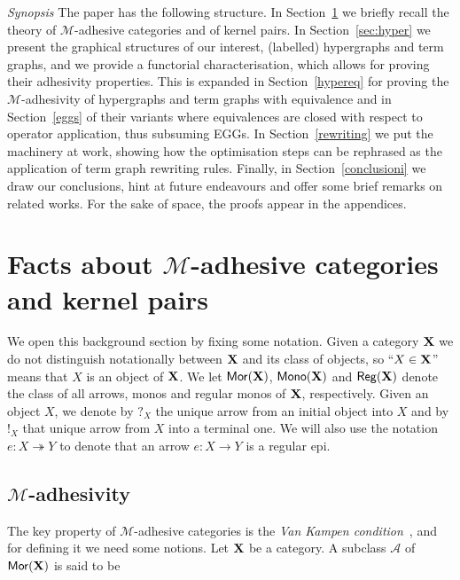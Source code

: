 \documentclass[a4paper,UKenglish,cleveref,pdftex,amsthm,thm-restate,numberwithinsect]{cas-sc}
\theoremstyle{plain}
\theoremstyle{definition}
\def\X{\textbf {\textup{X}}}
\newcommand{\mor}{\mathsf{Mor}}
\newcommand{\mon}{\mathsf{Mono}}
\newcommand{\reg}{\mathsf{Reg}}
\newcommand{\eto}{\twoheadrightarrow}
\begin{document}
\emph{Synopsis}
The paper has the following structure. 
In Section~\ref{sec:ade} we briefly recall 
the theory of $\mathcal{M}$-adhesive categories
and of kernel pairs.
In Section~\ref{sec:hyper} we present the graphical structures of our interest, 
 (labelled) hypergraphs and term graphs, and we provide a
functorial characterisation, which allows for proving their adhesivity properties.
This is expanded in Section~\ref{hypereq} for proving the $\mathcal{M}$-adhesivity
of hypergraphs 
and term graphs with equivalence and in Section~\ref{eggs} of
their variants where equivalences are closed with respect to operator application,
thus subsuming EGGs.
%
In Section~\ref{rewriting} we put the machinery at work, showing how the optimisation steps
can be rephrased as the application of term graph rewriting rules.
%
Finally, in Section~\ref{conclusioni} we draw our conclusions, hint at future endeavours and offer some 
brief remarks on related works.
%
For the sake of space, the proofs appear in the appendices. 

\section{Facts about $\mathcal{M}$-adhesive categories and kernel pairs}\label{sec:ade}


%
We open this background section by fixing some notation.
%
Given a category $\X$ we do not distinguish notationally between $\X$ and its class of objects, so
``$X\in \X$'' means that $X$ is an object of $\X$. We let $\mor(\X)$, $\mon(\X)$ and $\reg(\X)$ denote the class of all arrows, monos and regular monos of $\X$, respectively.  Given an object $X$, we  denote by $?_X$ the unique arrow from an initial object into $X$ and by $!_X$ that  unique arrow from $X$ into a terminal one. We will also use the notation $e\colon X\eto Y$ to denote that an arrow $e\colon X\to Y$ is a regular epi. 

\subsection{$\mathcal{M}$-adhesivity}\label{subsec:ade}
The key property of $\mathcal{M}$-adhesive categories is the \emph{Van Kampen condition}~\cite{brown1997van,johnstone2007quasitoposes,lack2005adhesive},
%
and for defining it we need some notions.
Let  $\X$ be a category. A subclass $\mathcal{A}$ of $\mor(\X)$ is said to be
\end{document}
